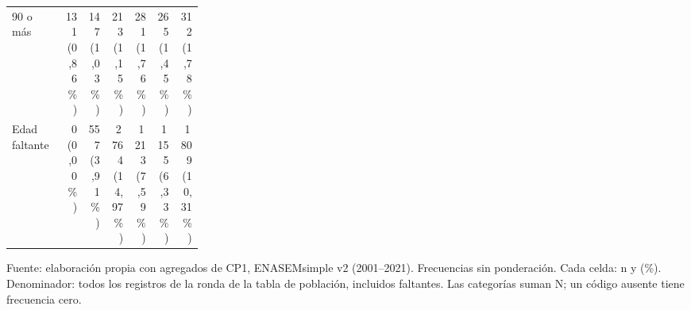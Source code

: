 \begin{table}[!htbp]
\begin{tabular}{p{0.28\linewidth}rrrrrr}
90 o más & \shortstack[r]{131\\(0,86\%)} & \shortstack[r]{147\\(1,03\%)} & \shortstack[r]{213\\(1,15\%)} & \shortstack[r]{281\\(1,76\%)} & \shortstack[r]{265\\(1,45\%)} & \shortstack[r]{312\\(1,78\%)} \\
Edad faltante & \shortstack[r]{0\\(0,00\%)} & \shortstack[r]{557\\(3,91\%)} & \shortstack[r]{2\,764\\(14,97\%)} & \shortstack[r]{1\,213\\(7,59\%)} & \shortstack[r]{1\,155\\(6,33\%)} & \shortstack[r]{1\,809\\(10,31\%)} \\
\bottomrule
\end{tabular}
\par\medskip
\parbox{\linewidth}{\footnotesize Fuente: elaboración propia con agregados de CP1, ENASEMsimple v2 (2001--2021). Frecuencias sin ponderación. Cada celda: n y (\%). Denominador: todos los registros de la ronda de la tabla de población, incluidos faltantes. Las categorías suman N; un código ausente tiene frecuencia cero.}
\end{table}
